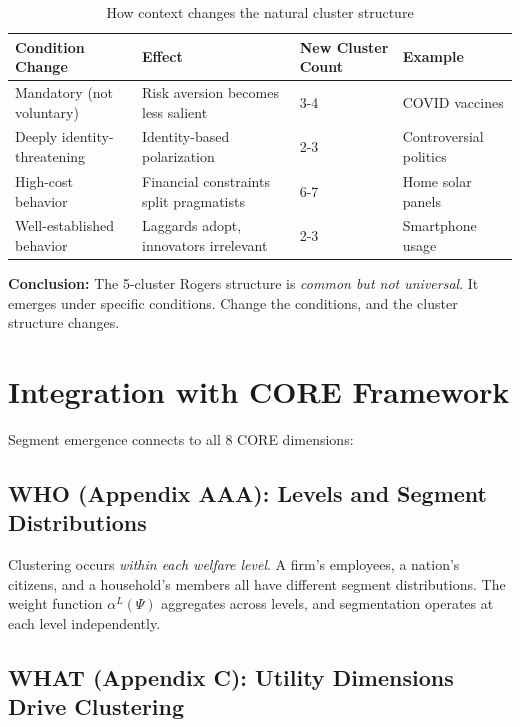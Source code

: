 \begin{table}[h]
\centering
\small
\begin{tabular}{llll}
\toprule
\textbf{Condition Change} & \textbf{Effect} & \textbf{New Cluster Count} & \textbf{Example} \\
\midrule
Mandatory (not voluntary) & Risk aversion becomes less salient & 3-4 & COVID vaccines \\
Deeply identity-threatening & Identity-based polarization & 2-3 & Controversial politics \\
High-cost behavior & Financial constraints split pragmatists & 6-7 & Home solar panels \\
Well-established behavior & Laggards adopt, innovators irrelevant & 2-3 & Smartphone usage \\
\bottomrule
\end{tabular}
\caption{How context changes the natural cluster structure}
\label{tab:cluster-variance}
\end{table}

\textbf{Conclusion:} The 5-cluster Rogers structure is \textit{common but not universal}.
It emerges under specific conditions. Change the conditions, and the cluster
structure changes.

\section{Integration with CORE Framework}
\label{sec:ba-integration}

Segment emergence connects to all 8 CORE dimensions:

\subsection{WHO (Appendix AAA): Levels and Segment Distributions}

Clustering occurs \textit{within each welfare level}. A firm's employees, a
nation's citizens, and a household's members all have different segment distributions.
The weight function $\alpha^L(\Psi)$ aggregates across levels, and segmentation
operates at each level independently.

\subsection{WHAT (Appendix C): Utility Dimensions Drive Clustering}

